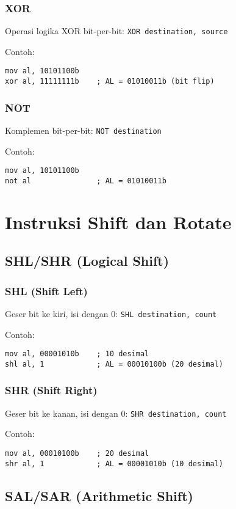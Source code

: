 \subsubsection{XOR}
Operasi logika XOR bit-per-bit: \texttt{XOR destination, source}

Contoh:
\begin{verbatim}
mov al, 10101100b
xor al, 11111111b    ; AL = 01010011b (bit flip)
\end{verbatim}

\subsubsection{NOT}
Komplemen bit-per-bit: \texttt{NOT destination}

Contoh:
\begin{verbatim}
mov al, 10101100b
not al               ; AL = 01010011b
\end{verbatim}

\section{Instruksi Shift dan Rotate}\label{sec:instruksi-dasar-shift}
\subsection{SHL/SHR (Logical Shift)}
\subsubsection{SHL (Shift Left)}
Geser bit ke kiri, isi dengan 0: \texttt{SHL destination, count}

Contoh:
\begin{verbatim}
mov al, 00001010b    ; 10 desimal
shl al, 1            ; AL = 00010100b (20 desimal)
\end{verbatim}

\subsubsection{SHR (Shift Right)}
Geser bit ke kanan, isi dengan 0: \texttt{SHR destination, count}

Contoh:
\begin{verbatim}
mov al, 00010100b    ; 20 desimal
shr al, 1            ; AL = 00001010b (10 desimal)
\end{verbatim}

\subsection{SAL/SAR (Arithmetic Shift)}
